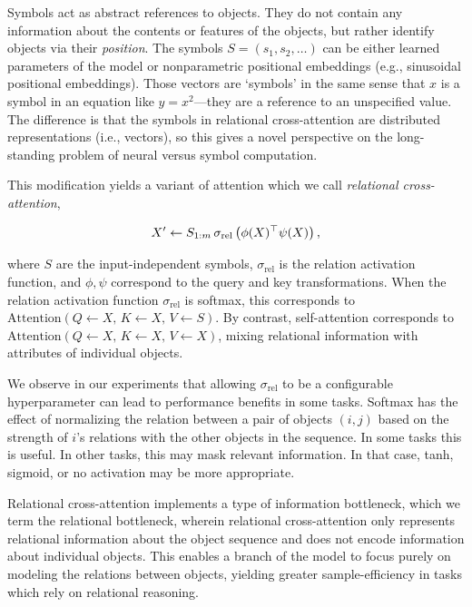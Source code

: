 Symbols act as abstract references to objects. They do not contain any information about the contents or features of the objects, but rather identify objects via their \textit{position}. The symbols $S = (s_1, s_2, \ldots)$ can be either learned parameters of the model or nonparametric positional embeddings (e.g., sinusoidal positional embeddings). Those vectors are `symbols' in the same sense that $x$ is a symbol in an equation like $y = x^2$---they are a reference to an unspecified value. The difference is that the symbols in relational cross-attention are distributed representations (i.e., vectors), so this gives a novel perspective on the long-standing problem of neural versus symbol computation.

This modification yields a variant of attention which we call \textit{relational cross-attention},

\begin{equation}\label{eq:relational_crossattn}
    X' \gets S_{1:m} \, \sigma_{\mathrm{rel}}\left(\phi(X)^\top \psi(X)\right),
\end{equation}

where $S$ are the input-independent symbols, $\sigma_{\mathrm{rel}}$ is the relation activation function, and $\phi, \psi$ correspond to the query and key transformations. When the relation activation function $\sigma_{\mathrm{rel}}$ is softmax, this corresponds to $\mathrm{Attention}(Q \gets X,\, K \gets X,\, V \gets S)$. By contrast, self-attention corresponds to $\mathrm{Attention}(Q \gets X,\, K \gets X,\, V \gets X)$, mixing relational information with attributes of individual objects.

We observe in our experiments that allowing $\sigma_{\mathrm{rel}}$ to be a configurable hyperparameter can lead to performance benefits in some tasks. Softmax has the effect of normalizing the relation between a pair of objects $(i,j)$ based on the strength of $i$'s relations with the other objects in the sequence. In some tasks this is useful. In other tasks, this may mask relevant information. In that case, tanh, sigmoid, or no activation may be more appropriate.

Relational cross-attention implements a type of information bottleneck, which we term the relational bottleneck, wherein relational cross-attention only represents relational information about the object sequence and does not encode information about individual objects. This enables a branch of the model to focus purely on modeling the relations between objects, yielding greater sample-efficiency in tasks which rely on relational reasoning.


